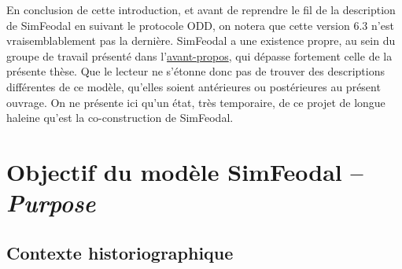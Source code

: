 En conclusion de cette introduction, et avant de reprendre le fil de la description de SimFeodal en suivant le protocole ODD, on notera que cette version 6.3 n'est vraisemblablement pas la dernière.
SimFeodal a une existence propre, au sein du groupe de travail présenté dans l'\hyperlink{avant-propos}{avant-propos}, qui dépasse fortement celle de la présente thèse.
Que le lecteur ne s'étonne donc pas de trouver des descriptions différentes de ce modèle, qu'elles soient antérieures ou postérieures au présent ouvrage.
On ne présente ici qu'un état, très temporaire, de ce projet de longue haleine qu'est la co-construction de SimFeodal.


\let\orisectionmark\sectionmark
\renewcommand\sectionmark[1]{}%
\section[Objectifs du modèle SimFeodal -- \textit{Purpose}]{Objectif du modèle SimFeodal -- \large{\textit{Purpose}}}
\orisectionmark{Objectifs}
\let\sectionmark\orisectionmark



\subsection{Contexte historiographique \label{subsec:contexte-historio}}

